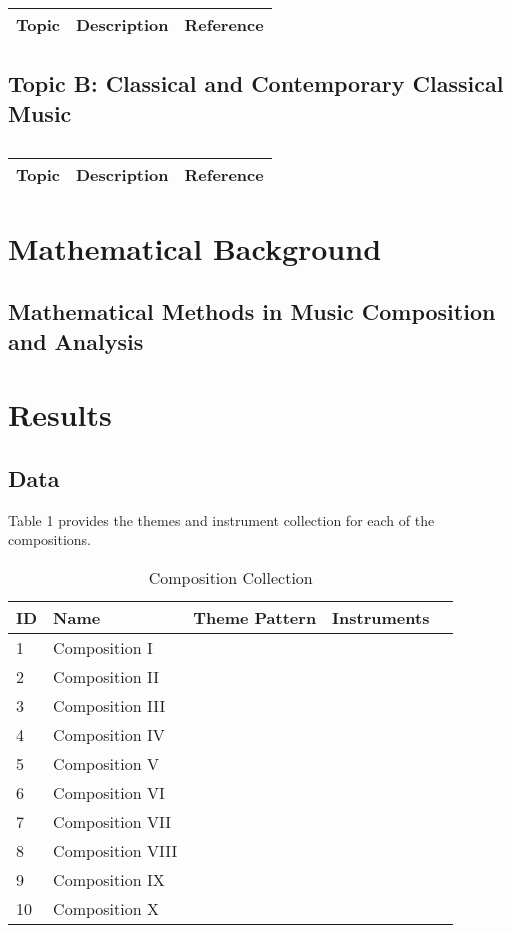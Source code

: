 \centering	
\begin{table}[H]\tiny
	\caption{}	
	\begin{tabular}{r|p{4cm}|l}
		\hline	
		Topic & Description & Reference \\
		\hline 
		\hline 
	\end{tabular}
\end{table}

\subsection{Topic B: Classical and Contemporary Classical Music}

\centering	
\begin{table}[H]\tiny
	\caption{}	
	\begin{tabular}{r|p{4cm}|l}
		\hline	
		Topic & Description & Reference \\
		\hline 
		\hline 
	\end{tabular}
\end{table}

\section{Mathematical Background}

\subsection{Mathematical Methods in Music Composition and Analysis}

\section{Results}

\subsection{Data}

Table 1 provides the themes and instrument collection for each of the compositions.
	
\begin{table}[H]
\caption{Composition Collection}	
\begin{tabular}{p{1cm}p{4cm}p{2cm}p{1cm}p{1cm}}
\hline
ID & Name & Theme Pattern & Instruments & \\
\hline 
1 & Composition I &  &  & \\
2 & Composition II &  &  & \\
3 & Composition III &  & \\
4 & Composition IV & & \\
5 & Composition V & & & \\
\hline 
6 & Composition VI &  &  & \\
7 & Composition VII &  &  & \\
8 & Composition VIII &  & \\
9 & Composition IX & & \\
10 & Composition X & & & \\
\end{tabular}
\end{table}

